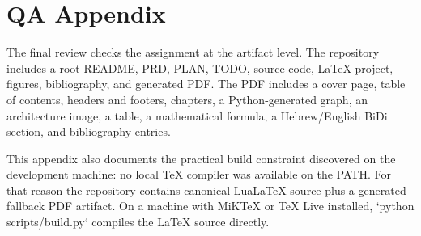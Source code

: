 \chapter{QA Appendix}
The final review checks the assignment at the artifact level. The repository includes a root README, PRD, PLAN, TODO, source code, LaTeX project, figures, bibliography, and generated PDF. The PDF includes a cover page, table of contents, headers and footers, chapters, a Python-generated graph, an architecture image, a table, a mathematical formula, a Hebrew/English BiDi section, and bibliography entries.

This appendix also documents the practical build constraint discovered on the development machine: no local TeX compiler was available on the PATH. For that reason the repository contains canonical LuaLaTeX source plus a generated fallback PDF artifact. On a machine with MiKTeX or TeX Live installed, `python scripts/build.py` compiles the LaTeX source directly.
